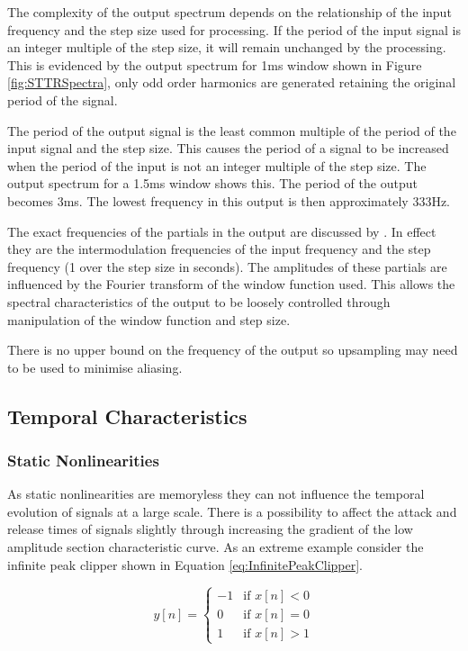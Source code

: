 			The complexity of the output spectrum depends on the relationship of the input frequency and the
			step size used for processing. If the period of the input signal is an integer multiple of the step
			size, it will remain unchanged by the processing. This is evidenced by the output spectrum for 1ms
			window shown in Figure \ref{fig:STTRSpectra}, only odd order harmonics are generated retaining the
			original period of the signal.

			The period of the output signal is the least common multiple of the period of the input signal and
			the step size. This causes the period of a signal to be increased when the period of the input is
			not an integer multiple of the step size. The output spectrum for a 1.5ms window shows this. The
			period of the output becomes 3ms. The lowest frequency in this output is then approximately 333Hz.

			The exact frequencies of the partials in the output are discussed by \citet{kim2014shorttime}. In
			effect they are the intermodulation frequencies of the input frequency and the step frequency (1
			over the step size in seconds). The amplitudes of these partials are influenced by the Fourier
			transform of the window function used. This allows the spectral characteristics of the output to be
			loosely controlled through manipulation of the window function and step size.

			There is no upper bound on the frequency of the output so upsampling may need to be used to
			minimise aliasing.

	\subsection{Temporal Characteristics}
	\label{sec:ExcitationEvaluation-Comparison-TemporalCharacteristics}
		\subsubsection*{Static Nonlinearities}
			As static nonlinearities are memoryless they can not influence the temporal evolution of signals at
			a large scale. There is a possibility to affect the attack and release times of signals slightly
			through increasing the gradient of the low amplitude section characteristic curve. As an extreme
			example consider the infinite peak clipper shown in Equation \ref{eq:InfinitePeakClipper}.

			\begin{equation}
				y[n] = \begin{cases}
					-1 & \text{if $x[n] < 0$} \\
					0 & \text{if $x[n] = 0$} \\
					1 & \text{if $x[n] > 1$}
				\end{cases}
				\label{eq:InfinitePeakClipper}
			\end{equation}
			
